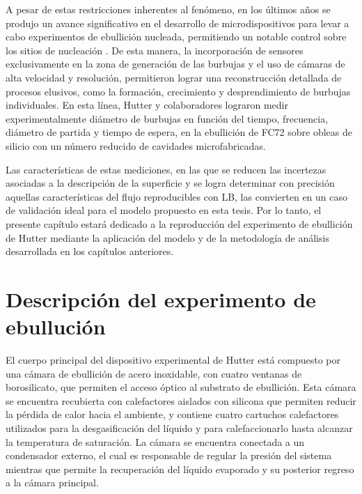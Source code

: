 A pesar de estas restricciones inherentes al fen\'omeno, en los \'ultimos a\~nos se produjo un avance significativo en el desarrollo de microdispositivos para levar a cabo experimentos de ebullici\'on nucleada, permitiendo un notable control sobre los sitios de nucleaci\'on \cite{gregorcic_scalable_2018, liu_experimental_2019}. De esta manera, la incorporaci\'on de sensores exclusivamente en la zona de generaci\'on de las burbujas y el uso de c\'amaras de alta velocidad y resoluci\'on, permitieron lograr una reconstrucci\'on detallada de procesos elusivos, como la formaci\'on, crecimiento y desprendimiento de burbujas individuales. En esta l\'inea, Hutter y colaboradores \cite{hutter_experimental_2009, hutter_experimental_2010} lograron medir experimentalmente di\'ametro de burbujas en funci\'on del tiempo, frecuencia, di\'ametro de partida y tiempo de espera, en la ebullici\'on de FC72 sobre obleas de silicio con un n\'umero reducido de cavidades microfabricadas. 

Las caracter\'isticas de estas mediciones, en las que se reducen las incertezas asociadas a la descripci\'on de la superficie y se logra determinar con precisi\'on aquellas caracter\'isticas del flujo reproducibles con LB, las convierten en un caso de validaci\'on ideal para el modelo propuesto en esta tesis. Por lo tanto, el presente cap\'itulo estar\'a dedicado a la reproducci\'on del experimento de ebullici\'on de Hutter mediante la aplicaci\'on del modelo y de la metodolog\'ia de an\'alisis desarrollada en los cap\'itulos anteriores.




\section{Descripci\'on del experimento de ebulluci\'on}

El cuerpo principal del dispositivo experimental de Hutter \cite{hutter_experimental_2010} est\'a compuesto por una c\'amara de ebullici\'on de acero inoxidable, con cuatro ventanas de borosilicato, que permiten el acceso \'optico al substrato de ebullici\'on. Esta c\'amara se encuentra recubierta con calefactores aislados con silicona que permiten reducir la p\'erdida de calor hacia el ambiente, y contiene cuatro cartuchos calefactores utilizados para la desgasificaci\'on del l\'iquido y para calefaccionarlo hasta alcanzar la temperatura de saturaci\'on. La c\'amara se encuentra conectada a un condensador externo, el cual es responsable de regular la presi\'on del sistema mientras que permite la recuperaci\'on del l\'iquido evaporado y su posterior regreso a la c\'amara principal.

